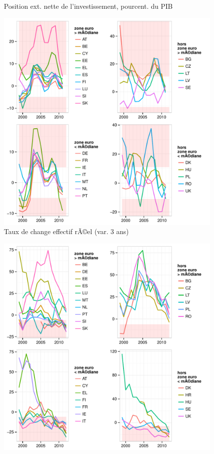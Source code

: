 \documentclass{article}\usepackage[]{graphicx}\usepackage[]{color}
\makeatletter
\def\maxwidth{ %
  \ifdim\Gin@nat@width>\linewidth
    \linewidth
  \else
    \Gin@nat@width
  \fi
}
\newenvironment{knitrout}{}{} %
\makeatother
\begin{document}
\begin{knitrout}
\begin{figure}[p]
{}

\caption[Position ext]{Position ext. nette de l'investissement, pourcent. du PIB\label{fig:byind2}}
\end{figure}

\begin{figure}[p]


{\centering \includegraphics[width=\maxwidth]{figure_graph/byind3} 

}

\caption[Taux de change effectif rÃ©el (var]{Taux de change effectif rÃ©el (var. 3 ans)\label{fig:byind3}}
\end{figure}

\begin{figure}[p]


{\centering \includegraphics[width=\maxwidth]{figure_graph/byind4} 

}
\end{figure}
\end{knitrout}
\end{document}
